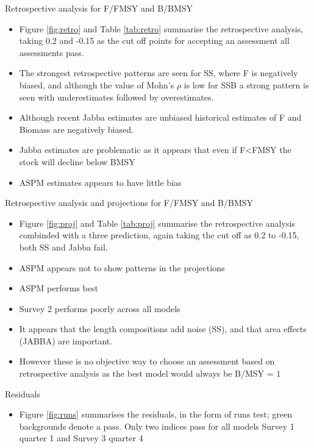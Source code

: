 \documentclass[a4paper]{article}
\begin{document}
\begin{description}
    \item{Retrospective analysis for F/FMSY and B/BMSY}
  
    \begin{itemize}
        \item Figure \ref{fig:retro} and Table \ref{tab:retro} summarise the retrospective analysis, taking 0.2 and -0.15 as the cut off points for accepting an assessment all assessments pass. 
        \item The strongest retrospective patterns are seen for SS, where F is negatively biased, and although the value of Mohn's $\rho$ is low for SSB a strong pattern is seen with underestimates followed by overestimates. 
        \item Although recent Jabba estimates are unbiased historical estimates of F and Biomass are negatively biased.
        \item Jabba estimates are problematic as it appears that even if F<FMSY the stock will decline below BMSY
        \item ASPM estimates appears to have little bias
    \end{itemize}
    \item{Retrospective analysis and projections for F/FMSY and B/BMSY} 
    \begin{itemize}
      \item Figure \ref{fig:proj} and Table \ref{tab:proj} summarise the retrospective analysis combinded with a three prediction, again taking the cut off as 0.2 to -0.15, both SS and Jabba fail.
      \item ASPM appears not to show patterns in the projections
        \item ASPM performs best
        \item Survey 2 performs poorly across all models
        \item It appears that the length compositions add noise (SS), and that area effects (JABBA) are important.
        \item However these is no objective way to choose an assessment based on retrospective analysis as the best model would always be B/MSY = 1 
   \end{itemize}
   \item{Residuals}
    \begin{itemize}
        \item Figure \ref{fig:runs} summarises the residuals, in the form of runs test; green backgrounds denote a pass. Only two indices pass for all models Survey 1 quarter 1 and Survey 3 quarter 4

\end{itemize}
\end{description}
\end{document}
